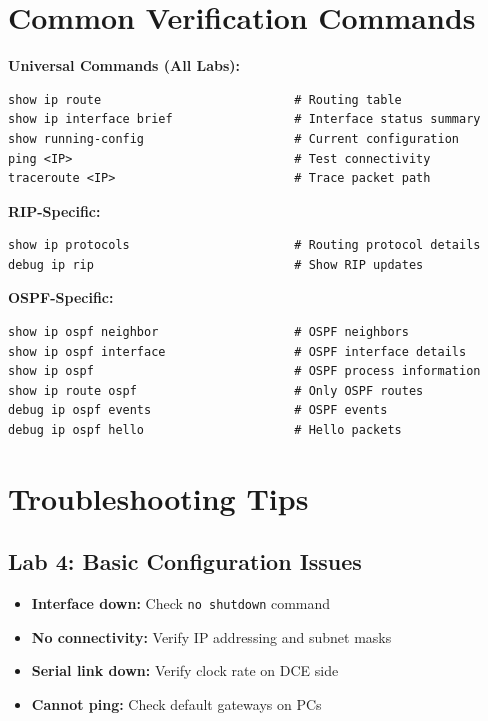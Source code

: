 \documentclass[12pt,a4paper]{article}
\begin{document}
\section{Common Verification Commands}

\begin{center}
\begin{tcolorbox}[colback=light,colframe=secondary,width=0.95\textwidth]
\textbf{Universal Commands (All Labs):}
\begin{lstlisting}
show ip route                           # Routing table
show ip interface brief                 # Interface status summary
show running-config                     # Current configuration
ping <IP>                               # Test connectivity
traceroute <IP>                         # Trace packet path
\end{lstlisting}

\vspace{0.3cm}
\textbf{RIP-Specific:}
\begin{lstlisting}
show ip protocols                       # Routing protocol details
debug ip rip                            # Show RIP updates
\end{lstlisting}

\vspace{0.3cm}
\textbf{OSPF-Specific:}
\begin{lstlisting}
show ip ospf neighbor                   # OSPF neighbors
show ip ospf interface                  # OSPF interface details
show ip ospf                            # OSPF process information
show ip route ospf                      # Only OSPF routes
debug ip ospf events                    # OSPF events
debug ip ospf hello                     # Hello packets
\end{lstlisting}
\end{tcolorbox}
\end{center}

\section{Troubleshooting Tips}

\subsection{Lab 4: Basic Configuration Issues}
\begin{itemize}
    \item \textbf{Interface down:} Check \texttt{no shutdown} command
    \item \textbf{No connectivity:} Verify IP addressing and subnet masks
    \item \textbf{Serial link down:} Verify clock rate on DCE side
    \item \textbf{Cannot ping:} Check default gateways on PCs
\end{itemize}
\end{document}
